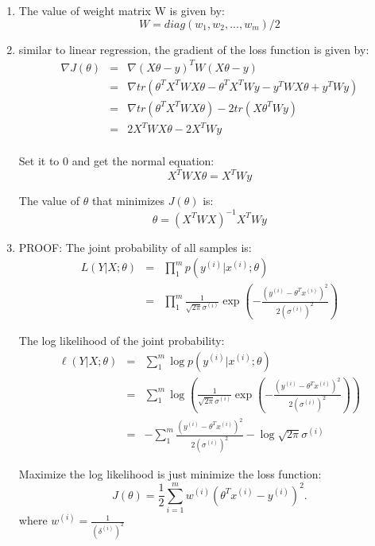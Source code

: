 \begin{answer}


\begin{enumerate}
\item The value of weight matrix W is given by:
\begin{equation*}
W = diag(w_1,w_2,...,w_m)/2
\end{equation*}

\item similar to linear regression, the gradient of the loss function is given by:
\begin{eqnarray*}
\nabla J(\theta) 
    &=& \nabla (X\theta - {y})^T W (X\theta - {y}) \\
    &=& \nabla tr(\theta^T X^T W X\theta - \theta^T X^T W y - y^T W X\theta + y^T W y) \\
    &=& \nabla tr(\theta^T X^T W X\theta) - 2tr(X\theta^T W y) \\
    &=& 2 X^T W X\theta - 2 X^T W y \\
\end{eqnarray*}

Set it to 0 and get the normal equation:
\begin{equation*}
    X^T W X\theta = X^T W y 
\end{equation*}

The value of $\theta$ that minimizes $J(\theta)$ is:
\begin{equation*}
    \theta = (X^T W X)^{-1} X^T W y 
\end{equation*}


\item PROOF:
The joint probability of all samples is:
\begin{eqnarray*}
L(Y|X;\theta) 
    &=& \prod_1^m p(y^{(i)} | x^{(i)} ; \theta) \\
    &=& \prod_1^m \frac{1}{\sqrt{2\pi}\sigma^{(i)}} \exp\left(-
    \frac{(y^{(i)} - \theta^Tx^{(i)})^2}{2(\sigma^{(i)})^2}\right)
\end{eqnarray*}

The log likelihood of the joint probability:
\begin{eqnarray*}
\ell(Y|X;\theta) 
    &=& \sum_1^m \log p(y^{(i)} | x^{(i)} ; \theta) \\
    &=& \sum_1^m \log \left(\frac{1}{\sqrt{2\pi}\sigma^{(i)}} \exp\left(-
    \frac{(y^{(i)} - \theta^Tx^{(i)})^2}{2(\sigma^{(i)})^2}\right) \right) \\
    &=& -\sum_1^m \frac{(y^{(i)} - \theta^Tx^{(i)})^2}{2(\sigma^{(i)})^2} - \log \sqrt{2\pi}\sigma^{(i)}
\end{eqnarray*}

Maximize the log likelihood is just minimize the loss function:
\begin{equation*}
	J(\theta) = \frac{1}{2} \sum_{i=1}^m w^{(i)}
		\left(\theta^Tx^{(i)} - y^{(i)}\right)^2.
\end{equation*}
where $w^{(i)} = \frac{1}{(\delta^{(i)})^2}$

\end{enumerate}
\end{answer}
